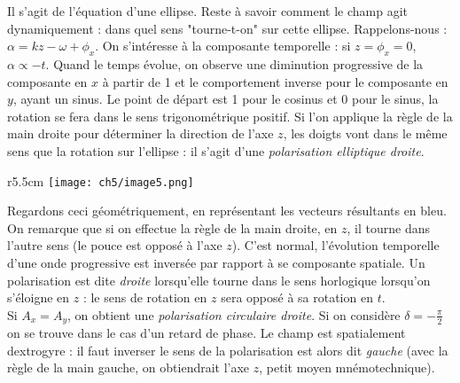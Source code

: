 	Il s'agit de l'équation d'une ellipse. Reste à savoir comment le champ agit dynamiquement : 
	dans quel sens "tourne-t-on" sur cette ellipse. Rappelons-nous : $\alpha = kz-\omega+\phi_x$. On 
	s'intéresse à la composante temporelle : si $z=\phi_x=0$, $\alpha \propto -t$. Quand le temps 
	évolue, on observe une diminution progressive de la composante en $x$ à partir de 1 et le comportement 
	inverse pour le composante en $y$, ayant un sinus. Le point de départ est 1 pour le cosinus et 0 
	pour le sinus, la rotation se fera dans le sens trigonométrique positif. Si l'on applique la 
	règle de la main droite pour déterminer la direction de l'axe $z$, les doigts vont dans le même 
	sens que la rotation sur l'ellipse : il s'agit d'une \textit{polarisation elliptique droite}.\\
	
 	\begin{wrapfigure}[7]{r}{5.5cm}
	\vspace{-5mm}
	\texttt{[image: ch5/image5.png]}
	\end{wrapfigure}	
	Regardons ceci géométriquement, en représentant les vecteurs résultants en bleu. On remarque 
	que si on effectue la règle de la main droite, en $z$, il tourne dans l'autre sens (le pouce 
	est opposé à l'axe $z$). C'est normal, l'évolution temporelle d'une onde progressive est inversée 
	par rapport à se composante spatiale. Un polarisation est dite \textit{droite} lorsqu'elle tourne 
	dans le sens horlogique lorsqu'on s'éloigne en $z$ : le sens de rotation en $z$ sera opposé à 
	sa rotation en $t$.\\
	
	Si $A_x=A_y$, on obtient une \textit{polarisation circulaire droite}. Si on considère $\delta = 
	-\frac{\pi}{2}$ on se trouve dans le cas d'un retard de phase. Le champ est spatialement 
	dextrogyre : il faut inverser le sens de la polarisation est alors dit \textit{gauche} (avec la
	règle de la main gauche, on obtiendrait l'axe $z$, petit moyen mnémotechnique).\\
	
